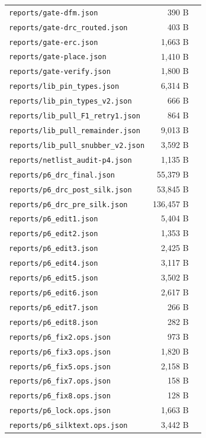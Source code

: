 \documentclass[11pt,a4paper]{article}
\begin{document}
{\begin{longtable}{p{9cm}rp{4cm}}
\texttt{reports/gate-dfm.json} & 390 B &  \\
\texttt{reports/gate-drc\_routed.json} & 403 B &  \\
\texttt{reports/gate-erc.json} & 1,663 B &  \\
\texttt{reports/gate-place.json} & 1,410 B &  \\
\texttt{reports/gate-verify.json} & 1,800 B &  \\
\texttt{reports/lib\_pin\_types.json} & 6,314 B &  \\
\texttt{reports/lib\_pin\_types\_v2.json} & 666 B &  \\
\texttt{reports/lib\_pull\_F1\_retry1.json} & 864 B &  \\
\texttt{reports/lib\_pull\_remainder.json} & 9,013 B &  \\
\texttt{reports/lib\_pull\_snubber\_v2.json} & 3,592 B &  \\
\texttt{reports/netlist\_audit-p4.json} & 1,135 B &  \\
\texttt{reports/p6\_drc\_final.json} & 55,379 B &  \\
\texttt{reports/p6\_drc\_post\_silk.json} & 53,845 B &  \\
\texttt{reports/p6\_drc\_pre\_silk.json} & 136,457 B &  \\
\texttt{reports/p6\_edit1.json} & 5,404 B &  \\
\texttt{reports/p6\_edit2.json} & 1,353 B &  \\
\texttt{reports/p6\_edit3.json} & 2,425 B &  \\
\texttt{reports/p6\_edit4.json} & 3,117 B &  \\
\texttt{reports/p6\_edit5.json} & 3,502 B &  \\
\texttt{reports/p6\_edit6.json} & 2,617 B &  \\
\texttt{reports/p6\_edit7.json} & 266 B &  \\
\texttt{reports/p6\_edit8.json} & 282 B &  \\
\texttt{reports/p6\_fix2.ops.json} & 973 B &  \\
\texttt{reports/p6\_fix3.ops.json} & 1,820 B &  \\
\texttt{reports/p6\_fix5.ops.json} & 2,158 B &  \\
\texttt{reports/p6\_fix7.ops.json} & 158 B &  \\
\texttt{reports/p6\_fix8.ops.json} & 128 B &  \\
\texttt{reports/p6\_lock.ops.json} & 1,663 B &  \\
\texttt{reports/p6\_silktext.ops.json} & 3,442 B &  \\

\end{longtable}}
\end{document}
